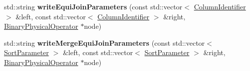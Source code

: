 \begin{DoxyCompactItemize}
\item 
\hypertarget{class_bobox_plan_writing_physical_operator_visitor_a03f4fd96dbe1a60b5e562a3e200d1263}{std\+::string {\bfseries write\+Equi\+Join\+Parameters} (const std\+::vector$<$ \hyperlink{class_column_identifier}{Column\+Identifier} $>$ \&left, const std\+::vector$<$ \hyperlink{class_column_identifier}{Column\+Identifier} $>$ \&right, \hyperlink{class_binary_physical_operator}{Binary\+Physical\+Operator} $\ast$node)}\label{class_bobox_plan_writing_physical_operator_visitor_a03f4fd96dbe1a60b5e562a3e200d1263}

\item 
\hypertarget{class_bobox_plan_writing_physical_operator_visitor_a30e0f62016ad2037261b8daa69752d5f}{std\+::string {\bfseries write\+Merge\+Equi\+Join\+Parameters} (const std\+::vector$<$ \hyperlink{class_sort_parameter}{Sort\+Parameter} $>$ \&left, const std\+::vector$<$ \hyperlink{class_sort_parameter}{Sort\+Parameter} $>$ \&right, \hyperlink{class_binary_physical_operator}{Binary\+Physical\+Operator} $\ast$node)}\label{class_bobox_plan_writing_physical_operator_visitor_a30e0f62016ad2037261b8daa69752d5f}


\end{DoxyCompactItemize}
